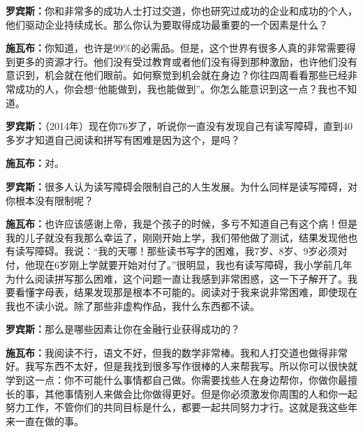 \begin{BookQuote}
\textbf{罗宾斯：}你和非常多的成功人士打过交道，你也研究过成功的企业和成功的个人，他们驱动企业持续成长。那么你认为要取得成功最重要的一个因素是什么？
\end{BookQuote}

\begin{BookQuote}
\textbf{施瓦布：}你知道，也许是99\%的必需品。但是，这个世界有很多人真的非常需要得到更多的资源才行。他们没有受过教育或者他们没有得到那种激励，也许他们没有意识到，机会就在他们眼前。如何察觉到机会就在身边？你往四周看看那些已经非常成功的人，你会想“他能做到，我也能做到”。你怎么能意识到这一点？我也不知道。
\end{BookQuote}

\begin{BookQuote}
\textbf{罗宾斯：}（2014年）现在你76岁了，听说你一直没有发现自己有读写障碍，直到40多岁才知道自己阅读和拼写有困难是因为这个，是吗？
\end{BookQuote}

\begin{BookQuote}
\textbf{施瓦布：}对。
\end{BookQuote}

\begin{BookQuote}
\textbf{罗宾斯：}很多人认为读写障碍会限制自己的人生发展。为什么同样是读写障碍，对你根本没有限制呢？
\end{BookQuote}

\begin{BookQuote}
\textbf{施瓦布：}也许应该感谢上帝，我是个孩子的时候，多亏不知道自己有这个病！但是我的儿子就没有我那么幸运了，刚刚开始上学，我们带他做了测试，结果发现他也有读写障碍。我说：“我的天哪！那些读书写字的困难，我7岁、8岁、9岁必须对付，他现在6岁刚上学就要开始对付了。”很明显，我也有读写障碍，我小学前几年为什么阅读拼写那么困难，这个问题一直让我感到非常困惑，这一下子解开了。我要看懂字母表，结果发现那是根本不可能的。阅读对于我来说非常困难，即使现在我也不读小说。除了那些非虚构作品，我什么东西都不读。
\end{BookQuote}

\begin{BookQuote}
\textbf{罗宾斯：}那么是哪些因素让你在金融行业获得成功的？
\end{BookQuote}

\begin{BookQuote}
\textbf{施瓦布：}我阅读不行，语文不好，但我的数学非常棒。我和人打交道也做得非常好。我写东西不太好，但是我找到很多写作很棒的人来帮我写。所以你可以很快就学到这一点：你不可能什么事情都自己做。你需要找些人在身边帮你，你做你最擅长的事，其他事情别人来做会比你做得更好。但是你必须激发你周围的人和你一起努力工作，不管你们的共同目标是什么，都要一起共同努力才行。这就是我这些年来一直在做的事。
\end{BookQuote}

